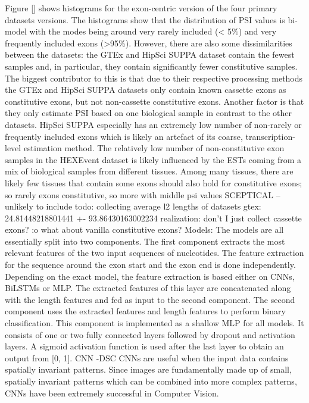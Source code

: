 Figure [] shows histograms for the exon-centric version of the four primary datasets versions. The histograms show that the distribution of PSI values is bi-model with the modes being around very rarely included (< 5\%) and very frequently included exons (>95\%). However, there are also some dissimilarities between the datasets: the GTEx and HipSci SUPPA dataset contain the fewest samples and, in particular, they contain significantly fewer constitutive samples.
The biggest contributor to this is that due to their respective processing methods the GTEx and HipSci SUPPA datasets only contain known cassette exons as constitutive exons, but not non-cassette constitutive exons. Another factor is that they only estimate PSI based on one biological sample in contrast to the other datasets. HipSci SUPPA especially has an extremely low number of non-rarely or frequently included exons which is likely an artefact of its coarse, transcription-level estimation method.
The relatively low number of non-constitutive exon samples in the HEXEvent dataset is likely influenced by the ESTs coming from a mix of biological samples from different tissues. Among many tissues, there are likely few tissues that contain some exons
should also hold for constitutive exons; so rarely exons constitutive, so more with middle psi values
SCEPTICAL -- unlikely to include
todo:
collecting average l2 lengths of datasets
gtex: 24.81448218801441 +- 93.86430163002234
realization: don't I just collect cassette exons? :o what about vanilla constitutive exons?
Models:
The models are all essentially split into two components.
The first component extracts the most relevant features of the two input sequences of nucleotides. The feature extraction for the sequence around the exon start and the exon end is done independently. Depending on the exact model, the feature extraction is based either on CNNs, BiLSTMs or MLP. The extracted features of this layer are concatenated along with the length features and fed as input to the second component.
The second component uses the extracted features and length features to perform binary classification. This component is implemented as a shallow MLP for all models. It consists of one or two fully connected layers followed by dropout and activation layers. A sigmoid activation function is used after the last layer to obtain an output from [0, 1].
CNN -DSC
CNNs are useful when the input data contains spatially invariant patterns. Since images are fundamentally made up of small, spatially invariant patterns which can be combined into more complex patterns, CNNs have been extremely successful in Computer Vision.

